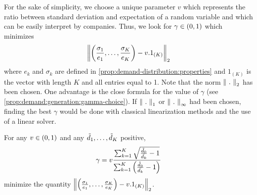For the sake of simplicity, we choose a unique parameter $v$ which represents the ratio between standard deviation and expectation of a random variable and which can be easily interpret by companies.
Thus, we look for $\gamma\in\bracket{0,1}$ which minimizes
\begin{equation}
  \norm{\bracket{\frac{\sigma_1}{e_1},\ldots,\frac{\sigma_K}{e_K}}-v.1_{(K)}}_2
\end{equation}
where $e_k$ and $\sigma_k$ are defined in \cref{prop:demand-distribution:properties} and $1_{(K)}$ is the vector with length $K$ and all entries equal to 1.
Note that the norm $\norm{\ .\ }_2$ has been chosen.
One advantage is the close formula for the value of $\gamma$ (see \cref{prop:demand:generation:gamma-choice}).
If $\norm{\ .\ }_1$ or $\norm{\ .\ }_{\infty}$ had been chosen, finding the best $\gamma$ would be done with classical linearization methods and the use of a linear solver.


\begin{prop}\label{prop:demand:generation:gamma-choice}
For any $v\in\bracket{0,1}$ and any $\tilde{d}_1,\ldots,\tilde{d}_K$ positive,
\begin{equation}
  \gamma
  =
  v\frac
  {\sum_{k=1}^K\sqrt{\frac{\tilde{\demand}_0}{\bar{\demand_k}}-1}}
  {\sum_{k=1}^K\bracket{\frac{\tilde{\demand}_0}{\bar{\demand_k}}-1}}
\end{equation}
minimize the quantity
$\norm{\bracket{\frac{\sigma_1}{e_1},\ldots,\frac{\sigma_K}{e_K}}-v.1_{(K)}}_2$.
\end{prop}


